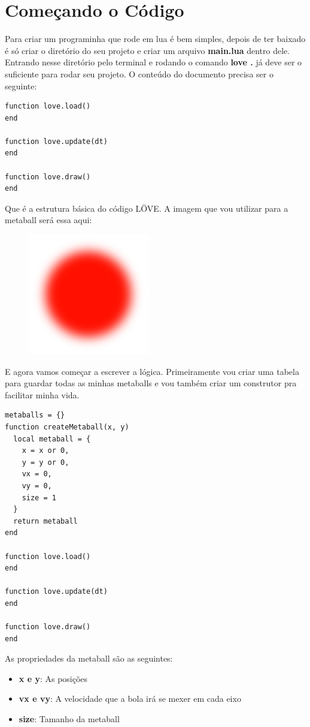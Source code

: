 \documentclass[a4paper,oneside,12pt]{article}
\begin{document}
\section{Começando o Código}

Para criar um programinha que rode em lua é bem simples, depois de ter baixado é só criar o diretório do seu projeto e criar um arquivo \textbf{main.lua} dentro dele. Entrando nesse diretório pelo terminal e rodando o comando \textbf{love .} já deve ser o suficiente para rodar seu projeto. O conteúdo do documento precisa ser o seguinte:

\begin{lstlisting}[language={[5.2]Lua}]
function love.load()
end

function love.update(dt)
end

function love.draw()
end
\end{lstlisting}

Que é a estrutura básica do código LÖVE. A imagem que vou utilizar para a metaball será essa aqui:

\begin{figure}[h]
    \centering
    \includegraphics[width=.2\linewidth]{media/metaball.png}
\end{figure}

E agora vamos começar a escrever a lógica. Primeiramente vou criar uma tabela para guardar todas as minhas metaballs e vou também criar um construtor pra facilitar minha vida.

\begin{lstlisting}[language={[5.2]Lua}]
metaballs = {}
function createMetaball(x, y)
  local metaball = {
    x = x or 0,
    y = y or 0,
    vx = 0,
    vy = 0,
    size = 1
  }
  return metaball
end

function love.load()
end

function love.update(dt)
end

function love.draw()
end
\end{lstlisting}

As propriedades da metaball são as seguintes:

\begin{itemize}
    \item \textbf{x e y}: As posições
    \item \textbf{vx e vy}: A velocidade que a bola irá se mexer em cada eixo
    \item \textbf{size}: Tamanho da metaball
\end{itemize}
\end{document}
